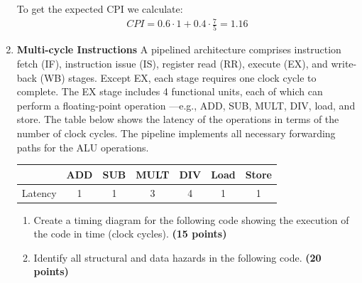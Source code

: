 \documentclass[a4paper, 11pt]{exam}
\begin{document}
\begin{enumerate}
{{To get the expected CPI we calculate:
\begin{align*}
CPI=0.6\cdot1+0.4\cdot\frac{7}{5}=1.16
\end{align*}
    }}
	\newline
    
	\item \textbf{Multi-cycle Instructions} A pipelined architecture comprises instruction fetch (IF), instruction issue (IS), register read (RR), execute (EX), and write-back (WB) stages. Except EX, each stage requires one clock cycle to complete. The EX stage includes 4
functional units, each of which can perform a floating-point operation —e.g., ADD, SUB, MULT, DIV, load, and store. The table below shows the latency of the operations in terms of the number of clock cycles. The pipeline implements all necessary forwarding paths for the ALU operations.

\begin{center}
\begin{tabular}{ |c|c|c|c|c|c|c| } 
 \hline
  & ADD & SUB & MULT & DIV & Load & Store \\ 
  \hline
 Latency & 1 & 1 & 3 & 4 & 1 & 1 \\ 
 \hline
\end{tabular}
\end{center}

\begin{enumerate}
\item Create a timing diagram for the following code showing the execution of the code in time (clock cycles). \textbf{(15 points)}

	\newline

\item Identify all structural and data hazards in the following code. \textbf {(20 points)}


\end{enumerate}
\end{enumerate}
\end{document}
